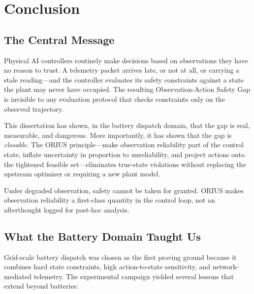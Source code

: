 
\chapter{Conclusion}
\label{ch:conclusion}

\section{The Central Message}

Physical AI controllers routinely make decisions based on observations they
have no reason to trust.  A telemetry packet arrives late, or not at all,
or carrying a stale reading---and the controller evaluates its safety
constraints against a state the plant may never have occupied.  The
resulting Observation-Action Safety Gap is invisible to any evaluation
protocol that checks constraints only on the observed trajectory.

This dissertation has shown, in the battery dispatch domain, that the gap
is real, measurable, and dangerous.  More importantly, it has shown that
the gap is \emph{closable}.  The ORIUS principle---make observation
reliability part of the control state, inflate uncertainty in proportion to
unreliability, and project actions onto the tightened feasible set---eliminates
true-state violations without replacing the upstream optimiser or requiring
a new plant model.

Under degraded observation, safety cannot be taken for granted.  ORIUS makes
observation reliability a first-class quantity in the control loop, not an
afterthought logged for post-hoc analysis.

\section{What the Battery Domain Taught Us}

Grid-scale battery dispatch was chosen as the first proving ground because
it combines hard state constraints, high action-to-state sensitivity, and
network-mediated telemetry.  The experimental campaign yielded several
lessons that extend beyond batteries:

